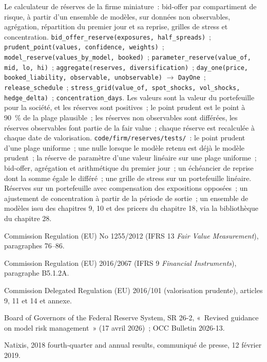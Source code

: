 \begin{build}
 Le calculateur de réserves de la firme miniature~: bid-offer par compartiment de risque,  à partir d'un ensemble de modèles,  sur données non observables,
agrégation, répartition du premier jour et sa reprise, grilles de stress et concentration.
 \texttt{bid\_offer\_reserve(exposures, half\_spreads)}~; \texttt{prudent\_point(values, confidence, weights)}~; \texttt{model\_reserve(values\_by\_model,
booked)}~; \texttt{parameter\_reserve(value\_of, mid, lo, hi)}~; \texttt{aggregate(reserves, diversification)}~; \texttt{day\_one(price, booked\_liability, observable,
unobservable)} $\to$ \texttt{DayOne}~; \texttt{release\_schedule}~; \texttt{stress\_grid(value\_of, spot\_shocks, vol\_shocks, hedge\_delta)}~; \texttt{concentration\_days}.
 Les valeurs sont la valeur du portefeuille pour la société, et les réserves sont positives~; le point prudent est le point à 90~\% de la plage plausible~; les réserves non observables sont
différées, les réserves observables font partie de la fair value~; chaque réserve est recalculée à chaque date de valorisation.
 \texttt{code/firm/reserves/tests/}~: le point prudent d'une plage uniforme~; une  nulle lorsque le modèle retenu est déjà le modèle prudent~;
la réserve de paramètre d'une valeur linéaire sur une plage uniforme~; bid-offer, agrégation et arithmétique du premier jour~; un échéancier de reprise dont la somme égale le différé~; une grille de stress sur un
portefeuille linéaire.
 Réserves sur un portefeuille avec compensation des expositions opposées~; un ajustement de concentration à partir de la période de sortie~; un ensemble de modèles issu des chapitres 9, 10 et des
pricers du chapitre 18, via la bibliothèque du chapitre 28.
\end{build}

\begin{omsources}
\item Commission Regulation (EU) No 1255/2012 (IFRS 13 \emph{Fair Value Measurement}), paragraphes 76--86.
\item Commission Regulation (EU) 2016/2067 (IFRS 9 \emph{Financial Instruments}), paragraphe B5.1.2A.
\item Commission Delegated Regulation (EU) 2016/101 (valorisation prudente), articles 9, 11 et 14 et annexe.
\item Board of Governors of the Federal Reserve System, SR 26-2, «~Revised guidance on model risk management~» (17 avril 2026)~; OCC Bulletin 2026-13.
\item Natixis, 2018 fourth-quarter and annual results, communiqué de presse, 12 février 2019.
\end{omsources}

